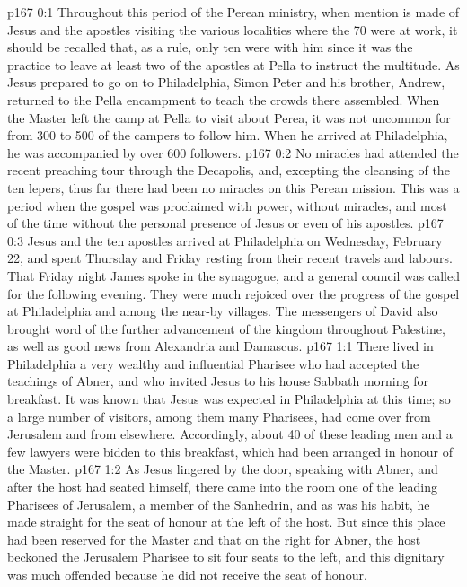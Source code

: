 \author{Midwayer Commission}
\vs p167 0:1 Throughout this period of the Perean ministry, when mention is made of Jesus and the apostles visiting the various localities where the 70 were at work, it should be recalled that, as a rule, only ten were with him since it was the practice to leave at least two of the apostles at Pella to instruct the multitude. As Jesus prepared to go on to Philadelphia, Simon Peter and his brother, Andrew, returned to the Pella encampment to teach the crowds there assembled. When the Master left the camp at Pella to visit about Perea, it was not uncommon for from 300 to 500 of the campers to follow him. When he arrived at Philadelphia, he was accompanied by over 600 followers.
\vs p167 0:2 No miracles had attended the recent preaching tour through the Decapolis, and, excepting the cleansing of the ten lepers, thus far there had been no miracles on this Perean mission. This was a period when the gospel was proclaimed with power, without miracles, and most of the time without the personal presence of Jesus or even of his apostles.
\vs p167 0:3 \pc Jesus and the ten apostles arrived at Philadelphia on Wednesday, February 22, and spent Thursday and Friday resting from their recent travels and labours. That Friday night James spoke in the synagogue, and a general council was called for the following evening. They were much rejoiced over the progress of the gospel at Philadelphia and among the near\hyp{}by villages. The messengers of David also brought word of the further advancement of the kingdom throughout Palestine, as well as good news from Alexandria and Damascus.
\vs p167 1:1 There lived in Philadelphia a very wealthy and influential Pharisee who had accepted the teachings of Abner, and who invited Jesus to his house Sabbath morning for breakfast. It was known that Jesus was expected in Philadelphia at this time; so a large number of visitors, among them many Pharisees, had come over from Jerusalem and from elsewhere. Accordingly, about 40 of these leading men and a few lawyers were bidden to this breakfast, which had been arranged in honour of the Master.
\vs p167 1:2 As Jesus lingered by the door, speaking with Abner, and after the host had seated himself, there came into the room one of the leading Pharisees of Jerusalem, a member of the Sanhedrin, and as was his habit, he made straight for the seat of honour at the left of the host. But since this place had been reserved for the Master and that on the right for Abner, the host beckoned the Jerusalem Pharisee to sit four seats to the left, and this dignitary was much offended because he did not receive the seat of honour.
